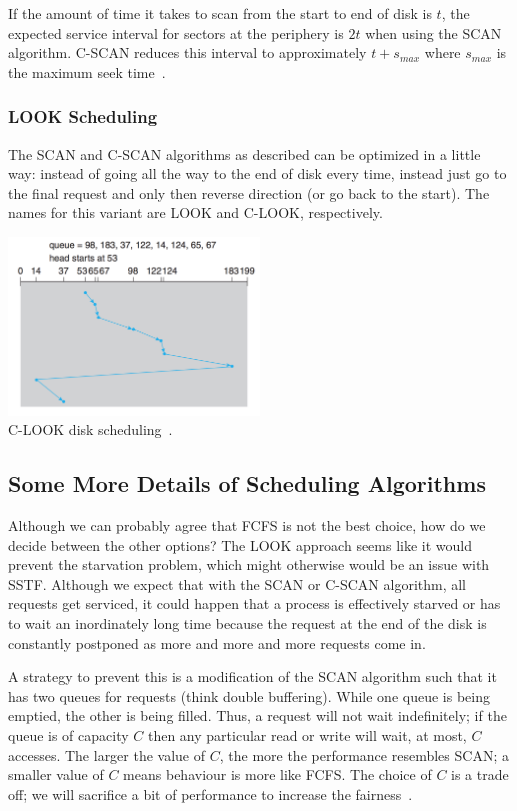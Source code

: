 If the amount of time it takes to scan from the start to end of disk is $t$, the expected service interval for sectors at the periphery is $2t$ when using the SCAN algorithm. C-SCAN reduces this interval to approximately $t + s_{max}$ where $s_{max}$ is the maximum seek time~\cite{osi}.


\subsubsection*{LOOK Scheduling}
The SCAN and C-SCAN algorithms as described can be optimized in a little way: instead of going all the way to the end of disk every time, instead just go to the final request and only then reverse direction (or go back to the start). The names for this variant are LOOK and C-LOOK, respectively. 

\begin{center}
	\includegraphics[width=0.5\textwidth]{images/disk-clook.png}\\
	C-LOOK disk scheduling~\cite{osc}.
\end{center}



\subsection*{Some More Details of Scheduling Algorithms}

Although we can probably agree that FCFS is not the best choice, how do we decide between the other options? The LOOK approach seems like it would prevent the starvation problem, which might otherwise would be an issue with SSTF. Although we expect that with the SCAN or C-SCAN algorithm, all requests get serviced, it could happen that a process is effectively starved or has to wait an inordinately long time because the request at the end of the disk is constantly postponed as more and more and more requests come in. 

A strategy to prevent this is a modification of the SCAN algorithm such that it has two queues for requests (think double buffering). While one queue is being emptied, the other is being filled. Thus, a request will not wait indefinitely; if the queue is of capacity $C$ then any particular read or write will wait, at most, $C$ accesses. The larger the value of $C$, the more the performance resembles SCAN; a smaller value of $C$ means behaviour is more like FCFS. The choice of $C$ is a trade off; we will sacrifice a bit of performance to increase the fairness~\cite{osi}.

